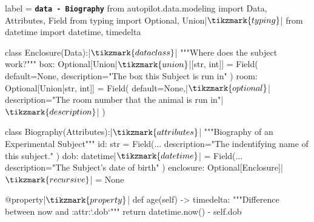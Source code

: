 \begin{pythoncode*}{label = \texttt{\textbf{data - Biography}}}
from autopilot.data.modeling import Data, Attributes, Field
from typing import Optional, Union|$\tikzmark{typing}$|
from datetime import datetime, timedelta

class Enclosure(Data):|$\tikzmark{dataclass}$|
    """Where does the subject work?"""
    box:  Optional[Union|$\tikzmark{union}$|[str, int]] = Field(
        default=None,
        description="The box this Subject is run in"
    )
    room: Optional[Union[str, int]] = Field(
        default=None,|$\tikzmark{optional}$|
        description="The room number that the animal is run in"|$\tikzmark{description}$|
    )

class Biography(Attributes):|$\tikzmark{attributes}$|
    """Biography of an Experimental Subject"""
    id:  str = Field(...
        description="The indentifying name of this subject."
    )
    dob: datetime|$\tikzmark{datetime}$| = Field(... 
        description="The Subject's date of birth"
    )
    enclosure: Optional[Enclosure]|$\tikzmark{recursive}$| = None

    @property|$\tikzmark{property}$|
    def age(self) -> timedelta:
        """Difference between now and :attr:`.dob`"""
        return datetime.now() - self.dob
\end{pythoncode*}
%
